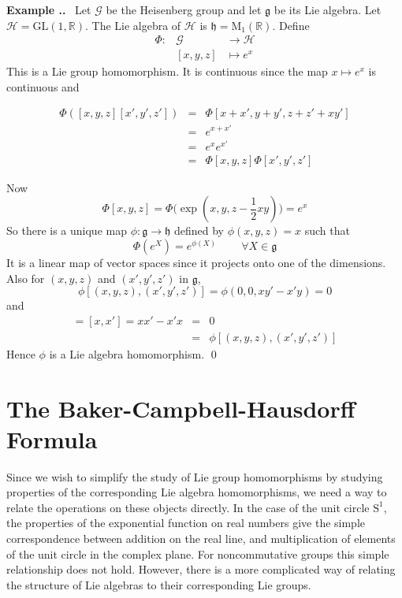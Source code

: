 \documentclass[honours]{UNSWthesis}
\newcommand{\R}{\mathbb{R}}
\newcommand{\G}{\mathcal{G}}
\newcommand{\g}{\mathfrak{g}}
\newcommand{\1}{\mathbf{e}_{1}}
\newcommand{\2}{\mathbf{e}_{3}}
\newcommand{\3}{\mathbf{e}_{3}}
\newcounter{Item}[section]
\newenvironment{Example}{\medskip
                            \refstepcounter{Item}
                            \noindent
                           {\bf Example \thesection.\theItem.}\ }
                           {\qed}
\begin{document}
\begin{Example}
Let $\G$ be the Heisenberg group and let $\g$ be its Lie algebra. Let $\mathcal{H}=\mathrm{GL}(1,\R)$. The Lie algebra of $\mathcal{H}$ is $\mathfrak{h}=\mathrm{M}_{1}(\R)$. Define 
\begin{eqnarray*}
\Phi :& \G &\longrightarrow  \mathcal{H} \\
&[x,y,z] &\longmapsto  e^{x}
\end{eqnarray*}
This is a Lie group homomorphism. It is continuous since the map $x \mapsto e^{x}$ is continuous and 

\begin{eqnarray*}
\Phi ([x,y,z][x',y',z']) &=& \Phi [x+x',y+y', z+z'+xy'] \\
&=& e^{x+x'} \\
&=& e^{x}e^{x'} \\
&=& \Phi [x,y,z] \Phi [x',y',z']
\end{eqnarray*}

Now
\[
\Phi [x,y,z] = \Phi (\exp{(x,y,z-\frac{1}{2}xy))}=e^{x}
\]
So there is a unique map $\phi: \g \longrightarrow \mathfrak{h}$ defined by $\phi(x,y,z)=x$ such that
\[
\Phi(e^{X}) = e^{\phi(X)} \;\;\;\;\;\;\;\; \forall X \in \g
\]
 It is a linear map of vector spaces since it projects onto one of the dimensions. Also for $(x,y,z)$ and $(x',y',z')$ in $\g$, 
\[ \phi [(x,y,z), (x',y',z')]=\phi (0,0,xy'-x'y)=0
\]
and
\begin{eqnarray*}
[\phi(x,y,z),\phi(x',y',z')]=[x,x']=xx'-x'x &=& 0 \\
&=&  \phi [(x,y,z), (x',y',z')]
\end{eqnarray*}
Hence $\phi$ is a Lie algebra homomorphism.
\end{Example}



\section{The Baker-Campbell-Hausdorff Formula}

Since we wish to simplify the study of Lie group homomorphisms by studying properties of the corresponding Lie algebra homomorphisms, we need a way to relate the operations on these objects directly. In the case of the unit circle $\mathrm{S}^{1}$, the properties of the exponential function on real numbers give the simple correspondence between addition on the real line, and multiplication of elements of the unit circle in the complex plane. For noncommutative groups this simple relationship does not hold. However, there is a more complicated way of relating the structure of Lie algebras to their corresponding Lie groups. 
\end{document}
